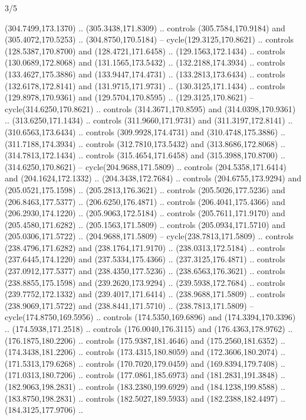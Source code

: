 \begin{flagdescription}{3/5}
\begin{scope}[scale=0.00214\flagwidth,yshift=162mm]
\begin{scope}[y=-0.8pt, x=0.8pt, inner sep=0pt, outer sep=0pt]
\begin{scope}[draw,fill=gold,line join=round,line cap=round,line width=0.0025\flagwidth]
\begin{scope}[line width=0.0025\flagwidth]
(304.7499,173.1370) .. (305.3438,171.8309) .. controls (305.7584,170.9184) and
(305.4072,170.5253) .. (304.8750,170.5184) -- cycle(129.3125,170.8621) ..
controls (128.5387,170.8700) and (128.4721,171.6458) .. (129.1563,172.1434) ..
controls (130.0689,172.8068) and (131.1565,173.5432) .. (132.2188,174.3934) ..
controls (133.4627,175.3886) and (133.9447,174.4731) .. (133.2813,173.6434) ..
controls (132.6178,172.8141) and (131.9715,171.9731) .. (130.3125,171.1434) ..
controls (129.8978,170.9361) and (129.5704,170.8595) .. (129.3125,170.8621) --
cycle(314.6250,170.8621) .. controls (314.3671,170.8595) and
(314.0398,170.9361) .. (313.6250,171.1434) .. controls (311.9660,171.9731) and
(311.3197,172.8141) .. (310.6563,173.6434) .. controls (309.9928,174.4731) and
(310.4748,175.3886) .. (311.7188,174.3934) .. controls (312.7810,173.5432) and
(313.8686,172.8068) .. (314.7813,172.1434) .. controls (315.4654,171.6458) and
(315.3988,170.8700) .. (314.6250,170.8621) -- cycle(204.9688,171.5809) ..
controls (204.5358,171.6414) and (204.1624,172.1332) .. (204.3438,172.7684) ..
controls (204.6755,173.9294) and (205.0521,175.1598) .. (205.2813,176.3621) ..
controls (205.5026,177.5236) and (206.8463,177.5377) .. (206.6250,176.4871) ..
controls (206.4041,175.4366) and (206.2930,174.1220) .. (205.9063,172.5184) ..
controls (205.7611,171.9170) and (205.4580,171.6282) .. (205.1563,171.5809) ..
controls (205.0934,171.5710) and (205.0306,171.5722) .. (204.9688,171.5809) --
cycle(238.7813,171.5809) .. controls (238.4796,171.6282) and
(238.1764,171.9170) .. (238.0313,172.5184) .. controls (237.6445,174.1220) and
(237.5334,175.4366) .. (237.3125,176.4871) .. controls (237.0912,177.5377) and
(238.4350,177.5236) .. (238.6563,176.3621) .. controls (238.8855,175.1598) and
(239.2620,173.9294) .. (239.5938,172.7684) .. controls (239.7752,172.1332) and
(239.4017,171.6414) .. (238.9688,171.5809) .. controls (238.9069,171.5722) and
(238.8441,171.5710) .. (238.7813,171.5809) -- cycle(174.8750,169.5956) ..
controls (174.5350,169.6896) and (174.3394,170.3396) .. (174.5938,171.2518) ..
controls (176.0040,176.3115) and (176.4363,178.9762) .. (176.1875,180.2206) ..
controls (175.9387,181.4646) and (175.2560,181.6352) .. (174.3438,181.2206) ..
controls (173.4315,180.8059) and (172.3606,180.2074) .. (171.5313,179.6268) ..
controls (170.7020,179.0459) and (169.8394,179.7408) .. (171.0313,180.7206) ..
controls (177.0861,185.6973) and (181.2831,191.3848) .. (182.9063,198.2831) ..
controls (183.2380,199.6929) and (184.1238,199.8588) .. (183.8750,198.2831) ..
controls (182.5027,189.5933) and (182.2388,182.4497) .. (184.3125,177.9706) ..

\end{scope}
\end{scope}
\end{scope}
\end{scope}
\end{flagdescription}
